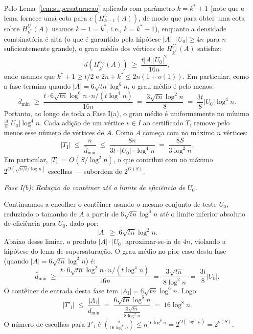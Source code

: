 \documentclass[reqno,a4paper,12pt]{amsart}
\begin{document}
Pelo Lema~\ref{lem:supersaturacao} aplicado com parâmetro $k = k^*+1$ (note que o lema fornece uma cota para $e(H_{k-1}^U(A))$, de modo que para obter uma cota sobre $H_{k^*}^U(A)$ usamos $k-1 = k^*$, i.e., $k = k^*+1$), enquanto a densidade combinatória é alta (o que é garantido pela hipótese $|A| \cdot |U_0| \geq 4n$ para $n$ suficientemente grande), o grau médio dos vértices de $H_{k^*}^{U_0}(A)$ satisfaz:
\[
  \bar{d}(H_{k^*}^{U_0}(A)) \;\geq\; \frac{t |A| |U_0|^2}{16n},
\]
onde usamos que $k^*+1 \geq t/2$ e $2n+k^* \leq 2n(1+o(1))$. Em particular, como a fase termina quando $|A| = 6\sqrt{tn}\log^6 n$, o grau médio é pelo menos:
\[
  \bar{d}_{\min} \;\geq\; \frac{t \cdot 6\sqrt{tn}\log^6 n \cdot n/(t\log^4 n)}{16n} \;=\; \frac{3\sqrt{tn}\log^2 n}{8} \;=\; \frac{3t}{8}|U_0|\log^4 n.
\]
Portanto, ao longo de toda a Fase I(a), o grau médio é uniformemente no mínimo $\frac{3t}{8}|U_0|\log^4 n$. Cada adição de um vértice $v \in I$ ao certificado $T_\mathrm{I}$ remove pelo menos esse número de vértices de $A$. Como $A$ começa com no máximo $n$ vértices:
\[
  |T_{\mathrm{I}}| \;\leq\; \frac{n}{\bar{d}_{\min}} \;\leq\; \frac{8n}{3t \cdot |U_0| \cdot \log^4 n} \;=\; \frac{8S}{3\log^2 n}.
\]
Em particular, $|T_{\mathrm{I}}| = O(S/\log^2 n)$, o que contribui com no máximo $2^{O(\sqrt{n/t}/\log n)}$ escolhas — subordem de $2^{O(S)}$.

\medskip

\noindent\textit{Fase I(b): Redução do contêiner até o limite de eficiência de $U_0$.}

Continuamos a encolher o contêiner usando o mesmo conjunto de teste $U_0$, reduzindo o tamanho de $A$ a partir de $6\sqrt{t n}\log^6 n$ até o limite inferior absoluto de eficiência para $U_0$, dado por:
\[
  |A| \;\geq\; 6\sqrt{t n}\log^2 n.
\]
Abaixo desse limiar, o produto $|A| \cdot |U_0|$ aproximar-se-ia de $4n$, violando a hipótese do lema de supersaturação. O grau médio no pior caso desta fase (quando $|A| = 6\sqrt{tn}\log^2 n$) é:
\[
  \bar{d}_{\min} \;\geq\; \frac{t \cdot 6\sqrt{tn}\log^2 n \cdot n/(t\log^4 n)}{16n} \;=\; \frac{3\sqrt{tn}}{8\log^2 n} \;=\; \frac{3t}{8}|U_0|.
\]
O contêiner de entrada desta fase tem $|A_\mathrm{I}| = 6\sqrt{tn}\log^6 n$. Logo:
\[
  |T'_{\mathrm{I}}| \;\leq\; \frac{|A_\mathrm{I}|}{\bar{d}_{\min}} \;=\; \frac{6\sqrt{tn}\log^6 n}{\frac{3\sqrt{tn}}{8\log^2 n}} \;=\; 16\log^8 n.
\]
O número de escolhas para $T'_\mathrm{I}$ é $\binom{n}{16\log^8 n} \leq n^{16\log^8 n} = 2^{O(\log^9 n)} = 2^{o(S)}$.

\medskip
\end{document}
